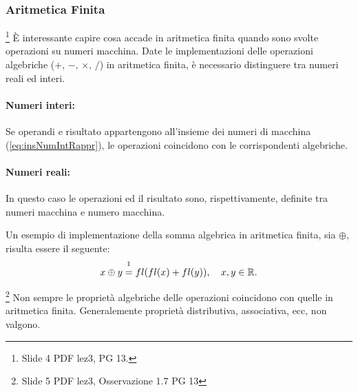 \subsubsection{Aritmetica Finita}\footnote{Slide 4 PDF lez3, PG 13.}
È interessante capire cosa accade in aritmetica finita quando sono svolte operazioni su numeri macchina. Date le implementazioni delle operazioni algebriche ($+,\, -,\,\times,\, \slash$) in aritmetica finita, è necessario distinguere tra numeri reali ed interi.

\paragraph{Numeri interi:} Se operandi e risultato appartengono all'insieme dei numeri di macchina (\ref{eq:insNumIntRappr}), le operazioni coincidono con le corrispondenti algebriche.

\paragraph{Numeri reali:} In questo caso le operazioni ed il risultato sono, rispettivamente, definite tra numeri macchina e numero macchina.

Un esempio di implementazione della somma algebrica in aritmetica finita, sia $\oplus$, risulta essere il seguente:
\begin{equation*}
	x\oplus y\overset{\footnotemark}{=}fl(fl(x)+fl(y)),\quad x,y\in\mathbb R.
\end{equation*}

\begin{remark}\footnote{Slide 5 PDF lez3, Osservazione 1.7 PG 13}
	Non sempre le proprietà algebriche delle operazioni coincidono con quelle in aritmetica finita. Generalemente proprietà distributiva, associativa, ecc, non valgono.
\end{remark}

